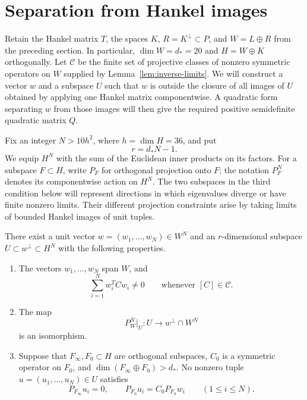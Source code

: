 \section{Separation from Hankel images}
\label{sec:separation}

Retain the Hankel matrix $T$, the spaces $K$, $R=K^\perp\subset P$,
and $W=L\oplus R$ from the preceding section.  In particular,
$\dim W=d_*=20$ and $H=W\oplus K$ orthogonally.  Let $\mathcal C$
be the finite set of projective classes of nonzero symmetric operators
on $W$ supplied by Lemma~\ref{lem:inverse-limits}.
We will construct a vector $w$ and a subspace $U$ such that $w$ is
outside the closure of all images of $U$ obtained by applying one
Hankel matrix componentwise.  A quadratic form separating $w$ from
those images will then give the required positive semidefinite
quadratic matrix $Q$.

Fix an integer $N>10h^2$, where $h=\dim H=36$, and put
\begin{equation}
\label{eq:separation-dimensions}
 r=d_*N-1.
\end{equation}
We equip $H^N$ with the sum of the Euclidean inner products on its
factors.  For a subspace $F\subset H$, write $P_F$ for orthogonal
projection onto $F$; the notation $P_F^N$ denotes its componentwise
action on $H^N$.
The two subspaces in the third condition below will represent
directions in which eigenvalues diverge or have finite nonzero
limits.  Their different projection constraints arise by taking
limits of bounded Hankel images of unit tuples.

\begin{lemma}
\label{lem:generic-wu}
There exist a unit vector $w=(w_1,\ldots,w_N)\in W^N$ and an
$r$-dimensional subspace $U\subset w^\perp\subset H^N$ with the
following properties.
\begin{enumerate}
\item The vectors $w_1,\ldots,w_N$ span $W$, and
\begin{equation}
\label{eq:inverse-pairings}
 \sum_{i=1}^N w_i^T Cw_i\ne0
 \qquad\text{whenever }[C]\in\mathcal C.
\end{equation}
\item The map
\begin{equation}
\label{eq:projection-U}
 P_W^N\big|_U:U\longrightarrow w^\perp\cap W^N
\end{equation}
is an isomorphism.
\item Suppose that $F_\infty,F_0\subset H$ are orthogonal subspaces,
$C_0$ is a symmetric operator on $F_0$, and
$\dim(F_\infty\oplus F_0)>d_*$.  No nonzero tuple
$u=(u_1,\ldots,u_N)\in U$ satisfies
\begin{equation}
\label{eq:forbidden-projections}
 P_{F_\infty}u_i=0,\qquad
 P_{F_0}u_i=C_0P_{F_0}w_i
 \qquad(1\le i\le N).
\end{equation}
\end{enumerate}
\end{lemma}

